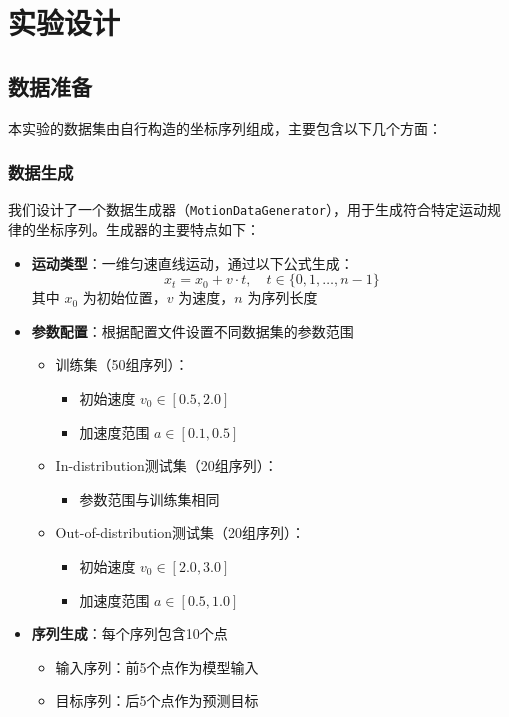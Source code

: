 \documentclass[a4paper, 12pt]{article}
\begin{document}
\section{实验设计}
\subsection{数据准备}
本实验的数据集由自行构造的坐标序列组成，主要包含以下几个方面：

\subsubsection{数据生成}
我们设计了一个数据生成器（\texttt{MotionDataGenerator}），用于生成符合特定运动规律的坐标序列。生成器的主要特点如下：

\begin{itemize}
    \item \textbf{运动类型}：一维匀速直线运动，通过以下公式生成：
        \begin{equation}
            x_t = x_0 + v \cdot t, \quad t \in \{0,1,\ldots,n-1\}
        \end{equation}
        其中 $x_0$ 为初始位置，$v$ 为速度，$n$ 为序列长度
    
    \item \textbf{参数配置}：根据配置文件设置不同数据集的参数范围
        \begin{itemize}
            \item 训练集（50组序列）：
                \begin{itemize}
                    \item 初始速度 $v_0 \in [0.5, 2.0]$
                    \item 加速度范围 $a \in [0.1, 0.5]$
                \end{itemize}
            \item In-distribution测试集（20组序列）：
                \begin{itemize}
                    \item 参数范围与训练集相同
                \end{itemize}
            \item Out-of-distribution测试集（20组序列）：
                \begin{itemize}
                    \item 初始速度 $v_0 \in [2.0, 3.0]$
                    \item 加速度范围 $a \in [0.5, 1.0]$
                \end{itemize}
        \end{itemize}
    
    \item \textbf{序列生成}：每个序列包含10个点
        \begin{itemize}
            \item 输入序列：前5个点作为模型输入
            \item 目标序列：后5个点作为预测目标
        \end{itemize}
\end{itemize}
\end{document}
